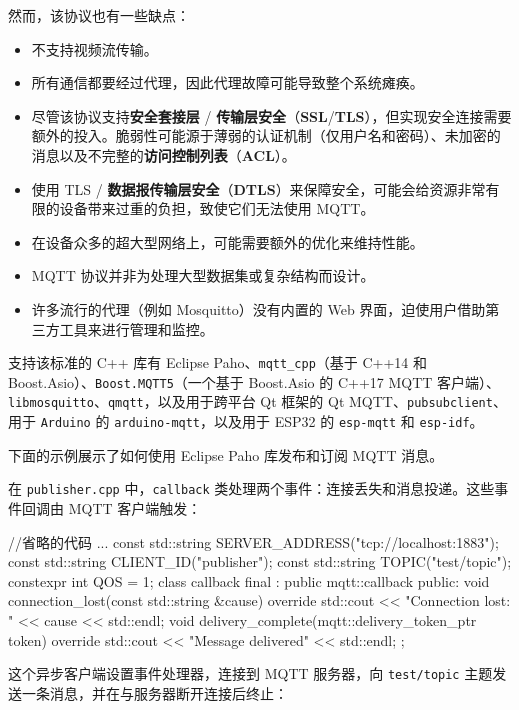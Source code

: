 \label{idx:1518}
然而，该协议也有一些缺点：

\begin{itemize}
\item 不支持视频流传输。
\item 所有通信都要经过代理，因此代理故障可能导致整个系统瘫痪。
\label{idx:1519}
\item 尽管该协议支持\textbf{安全套接层} / \textbf{传输层安全}（\textbf{SSL}/\textbf{TLS}），但实现安全连接需要额外的投入。脆弱性可能源于薄弱的认证机制（仅用户名和密码）、未加密的消息以及不完整的\textbf{访问控制列表}（\textbf{ACL}）。
\label{idx:1520}
\item 使用 TLS / \textbf{数据报传输层安全}（\textbf{DTLS}）来保障安全，可能会给资源非常有限的设备带来过重的负担，致使它们无法使用 MQTT。
\item 在设备众多的超大型网络上，可能需要额外的优化来维持性能。
\item MQTT 协议并非为处理大型数据集或复杂结构而设计。
\item 许多流行的代理（例如 Mosquitto）没有内置的 Web 界面，迫使用户借助第三方工具来进行管理和监控。
\end{itemize}

支持该标准的 C++ 库有 Eclipse Paho、\texttt{mqtt\_cpp}（基于 C++14 和 Boost.Asio）、\texttt{Boost.\allowbreak{}MQTT5}（一个基于 Boost.Asio 的 C++17 MQTT 客户端）、\texttt{libmosquitto}、\texttt{qmqtt}，以及用于跨平台 Qt 框架的 Qt MQTT、\texttt{pubsubclient}、用于 \texttt{Arduino} 的 \texttt{arduino-mqtt}，以及用于 ESP32 的 \texttt{esp-mqtt} 和 \texttt{esp-idf}。

下面的示例展示了如何使用 Eclipse Paho 库发布和订阅 MQTT 消息。

在 \texttt{publisher.\allowbreak{}cpp} 中，\texttt{callback} 类处理两个事件：连接丢失和消息投递。这些事件回调由 MQTT 客户端触发：

\begin{codebox}[cpp]
//省略的代码
...
const std::string SERVER_ADDRESS("tcp://localhost:1883");
const std::string CLIENT_ID("publisher");
const std::string TOPIC("test/topic");
constexpr int QOS = 1;
class callback final : public mqtt::callback {
public:
  void connection_lost(const std::string &cause) override {
    std::cout << "Connection lost: " << cause << std::endl;
  }
  void delivery_complete(mqtt::delivery_token_ptr token) override {
    std::cout << "Message delivered" << std::endl;
  }
};
\end{codebox}

\label{idx:1521}
这个异步客户端设置事件处理器，连接到 MQTT 服务器，向 \texttt{test/\allowbreak{}topic} 主题发送一条消息，并在与服务器断开连接后终止：

